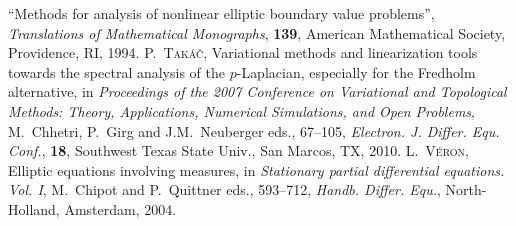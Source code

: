 \documentclass[twoside,reqno]{amsart}
\numberwithin{equation}{section}
\theoremstyle{definition}
\newcommand{\au}[1]{\textsc{#1}}
\newcommand{\titleart}[1]{\textrm{#1}}
\newcommand{\jour}[1]{\textit{#1}}
\newcommand{\volart}[1]{\textbf{#1}}
\newcommand{\no}[1]{\textit{no.} {#1}}
\begin{document}
\begin{thebibliography}{99}
``Methods for analysis of nonlinear elliptic 
boundary value problems'',
\textit{Translations of Mathematical Monographs}, \textbf{139},
American Mathematical Society, Providence, RI, 1994.
%
%
\au{P.~Tak{\'a}{\v{c}}},
\titleart{Variational methods and linearization tools 
towards the spectral analysis of the {$p$}-{L}aplacian, 
especially for the {F}redholm alternative},
in \textit{Proceedings of the 2007 {C}onference on {V}ariational 
and {T}opological {M}ethods: {T}heory, {A}pplications, 
{N}umerical {S}imulations, and {O}pen {P}roblems},
M.~Chhetri, P.~Girg and J.M.~Neuberger eds., 67--105,
\jour{Electron. J. Differ. Equ. Conf.}, \volart{18},
Southwest Texas State Univ., San Marcos, TX, 2010.
%
\au{L.~V{\'e}ron},
\titleart{Elliptic equations involving measures},
in \textit{Stationary partial differential equations. {V}ol. {I}},
M.~Chipot and P.~Quittner eds.,
593--712, \textit{Handb. Differ. Equ.}, North-Holland, 
Amsterdam, 2004.
%
%
\end{thebibliography}
%
\end{document}
